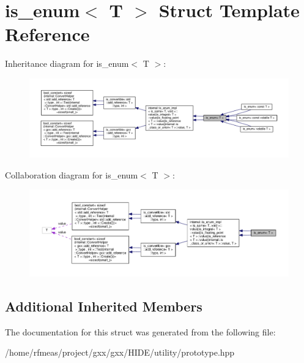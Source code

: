 \hypertarget{structis__enum}{}\section{is\+\_\+enum$<$ T $>$ Struct Template Reference}
\label{structis__enum}


Inheritance diagram for is\+\_\+enum$<$ T $>$\+:
\nopagebreak
\begin{figure}[H]
\begin{center}
\leavevmode
\includegraphics[width=350pt]{structis__enum__inherit__graph}
\end{center}
\end{figure}


Collaboration diagram for is\+\_\+enum$<$ T $>$\+:
\nopagebreak
\begin{figure}[H]
\begin{center}
\leavevmode
\includegraphics[width=350pt]{structis__enum__coll__graph}
\end{center}
\end{figure}
\subsection*{Additional Inherited Members}


The documentation for this struct was generated from the following file\+:\begin{DoxyCompactItemize}
\item 
/home/rfmeas/project/gxx/gxx/\+H\+I\+D\+E/utility/prototype.\+hpp\end{DoxyCompactItemize}
